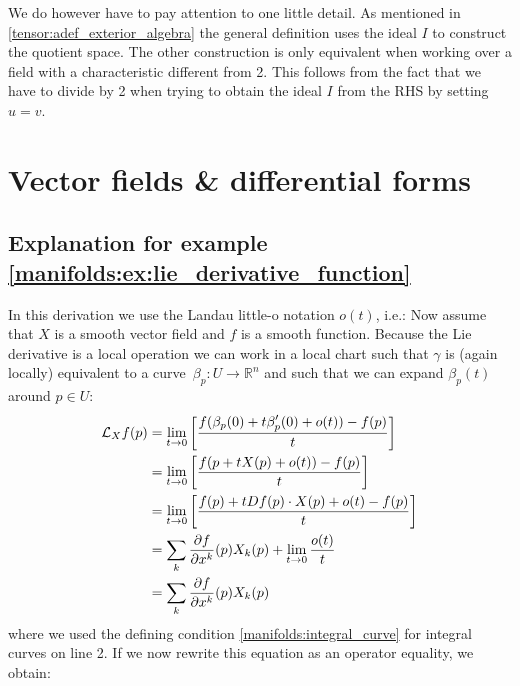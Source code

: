 	We do however have to pay attention to one little detail. As mentioned in \ref{tensor:adef_exterior_algebra} the general definition uses the ideal $I$ to construct the quotient space. The other construction is only equivalent when working over a field with a characteristic different from 2. This follows from the fact that we have to divide by 2 when trying to obtain the ideal $I$ from the RHS by setting $u=v$.

\section{Vector fields \& differential forms}

\subsection{Explanation for example \ref{manifolds:ex:lie_derivative_function}}

In this derivation we use the Landau little-o notation $o(t)$, i.e.:
		Now assume that $X$  is a smooth vector field and $f$ is a smooth function. Because the Lie derivative is a local operation we can work in a local chart such that $\gamma$ is (again locally) equivalent to a curve\footnotemark\ $\beta_p:U\rightarrow\mathbb{R}^n$ and such that we can expand $\beta_p(t)$ around $p\in U$:
		\begin{align}
			\mathcal{L}_Xf(p) &= \lim_{t\rightarrow0}\left[\stylefrac{f(\beta_p(0) + t\beta_p'(0) + o(t)) - f(p)}{t}\right]\nonumber\\
			&= \lim_{t\rightarrow0}\left[\stylefrac{f(p + tX(p) + o(t)) - f(p)}{t}\right]\nonumber\\
			&= \lim_{t\rightarrow0}\left[\stylefrac{f(p) + tDf(p)\cdot X(p) + o(t) - f(p)}{t}\right]\nonumber\\
			&= \sum_k\pderiv{f}{x^k}(p)X_k(p) + \lim_{t\rightarrow0}\stylefrac{o(t)}{t}\nonumber\\
			&= \sum_k\pderiv{f}{x^k}(p)X_k(p)\label{manifolds:lie_derivative_calc}
		\end{align}
		where we used the defining condition \ref{manifolds:integral_curve} for integral curves on line 2. If we now rewrite this equation as an operator equality, we obtain:
		
		
